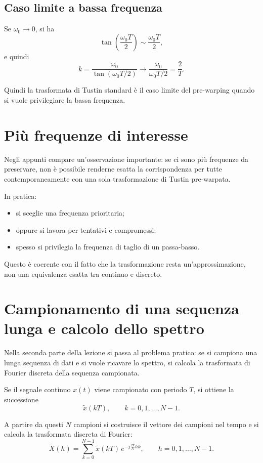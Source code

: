 \subsection*{Caso limite a bassa frequenza}

Se \(\omega_0\to 0\), si ha
\[
\tan\!\left(\frac{\omega_0 T}{2}\right)\sim \frac{\omega_0 T}{2},
\]
e quindi
\[
k=\frac{\omega_0}{\tan(\omega_0 T/2)}
\longrightarrow
\frac{\omega_0}{\omega_0 T/2}
=
\frac{2}{T}.
\]

Quindi la trasformata di Tustin standard è il caso limite del pre-warping
quando si vuole privilegiare la bassa frequenza.

\section{Più frequenze di interesse}

Negli appunti compare un'osservazione importante:
se ci sono più frequenze da preservare, non è possibile renderne esatta la corrispondenza
per tutte contemporaneamente con una sola trasformazione di Tustin pre-warpata.

In pratica:
\begin{itemize}
    \item si sceglie una frequenza prioritaria;
    \item oppure si lavora per tentativi e compromessi;
    \item spesso si privilegia la frequenza di taglio di un passa-basso.
\end{itemize}

Questo è coerente con il fatto che la trasformazione resta un'approssimazione,
non una equivalenza esatta tra continuo e discreto.

\section{Campionamento di una sequenza lunga e calcolo dello spettro}

Nella seconda parte della lezione si passa al problema pratico:
se si campiona una lunga sequenza di dati e si vuole ricavare lo spettro,
si calcola la trasformata di Fourier discreta della sequenza campionata.

Se il segnale continuo \(x(t)\) viene campionato con periodo \(T\), si ottiene la successione
\[
\tilde x(kT),\qquad k=0,1,\dots,N-1.
\]

A partire da questi \(N\) campioni si costruisce il vettore dei campioni nel tempo
e si calcola la trasformata discreta di Fourier:
\[
\tilde X(h)=\sum_{k=0}^{N-1}\tilde x(kT)\,e^{-j\frac{2\pi}{N}hk},
\qquad
h=0,1,\dots,N-1.
\]

